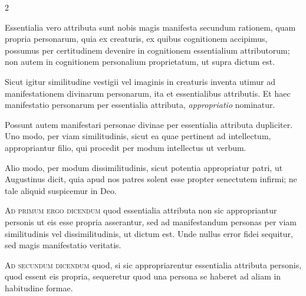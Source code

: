 \documentclass[paper=a4paper,fontsize=10pt,jafontsize=9pt,titlepage]{jlreq}
\begin{document}
\begin{paracol}{2}
\switchcolumn


\switchcolumn*

Essentialia vero attributa sunt nobis magis manifesta
secundum rationem, quam propria personarum, quia ex creaturis, ex quibus
cognitionem accipimus, possumus per certitudinem devenire in cognitionem
essentialium attributorum; non autem in cognitionem personalium proprietatum,
ut supra dictum est.

\switchcolumn


\switchcolumn*

Sicut igitur similitudine vestigii vel imaginis in
creaturis inventa utimur ad manifestationem divinarum personarum, ita et
essentialibus attributis. Et haec manifestatio personarum per essentialia
attributa, \textit{appropriatio} nominatur.

\switchcolumn


\switchcolumn*

Possunt autem manifestari personae divinae
per essentialia attributa dupliciter. Uno modo, per viam similitudinis, sicut
ea quae pertinent ad intellectum, appropriantur filio, qui procedit per modum
intellectus ut verbum.

\switchcolumn


\switchcolumn*

Alio modo, per modum dissimilitudinis, sicut potentia
appropriatur patri, ut Augustinus dicit, quia apud nos patres solent esse
propter senectutem infirmi; ne tale aliquid suspicemur in Deo.

\switchcolumn


\switchcolumn*

\textsc{Ad primum ergo dicendum} quod essentialia attributa non sic appropriantur
personis ut eis esse propria asserantur, sed ad manifestandum personas per viam
similitudinis vel dissimilitudinis, ut dictum est. Unde nullus error fidei
sequitur, sed magis manifestatio veritatis.

\switchcolumn


\switchcolumn*

\textsc{Ad secundum dicendum} quod, si sic appropriarentur essentialia attributa
personis, quod essent eis propria, sequeretur quod una persona se haberet ad
aliam in habitudine formae.


\end{paracol}
\end{document}
